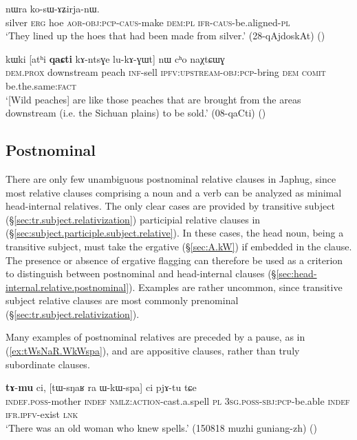 \begin{exe}
\ex \label{ex:qaR.thWkAsWBzu}
 nɯra ko-sɯ-ɤʑirja-nɯ. \\
silver \textsc{erg} hoe \textsc{aor}-\textsc{obj}:\textsc{pcp}-\textsc{caus}-make \textsc{dem}:\textsc{pl} \textsc{ifr}-\textsc{caus}-be.aligned-\textsc{pl} \\
\glt `They lined up the hoes that had been made from silver.' (28-qAjdoskAt)
()
\end{exe}  

\begin{exe}
\ex \label{ex:kAntsGe.lukAGWt}
\gll kɯki [atʰi \textbf{qaɕti} kɤ-ntsɣe lu-kɤ-ɣɯt] nɯ cʰo naχtɕɯɣ \\
\textsc{dem}.\textsc{prox} downstream peach \textsc{inf}-sell \textsc{ipfv}:\textsc{upstream}-\textsc{obj}:\textsc{pcp}-bring \textsc{dem} \textsc{comit} be.the.same:\textsc{fact} \\
\glt `[Wild peaches] are  like those peaches that are brought from the areas downstream (i.e. the Sichuan plains) to be sold.' (08-qaCti)
()
\end{exe}  
 
 \subsection{Postnominal} \label{sec:postnominal.relative}
 There are only few unambiguous postnominal relative clauses in Japhug, since most relative clauses comprising a noun and a verb can be analyzed as minimal head-internal relatives. The only clear cases are provided by transitive subject (§\ref{sec:tr.subject.relativization}) participial relative clauses in  (§\ref{sec:subject.participle.subject.relative}). In these cases, the head noun, being a transitive subject,  must take the ergative  (§\ref{sec:A.kW}) if embedded in the clause. The presence or absence of ergative flagging can therefore be used as a criterion to distinguish between postnominal and head-internal clauses (§\ref{sec:head-internal.relative.postnominal}). Examples are rather uncommon, since transitive subject relative clauses are most commonly prenominal (§\ref{sec:tr.subject.relativization}). 

Many examples of postnominal relatives are preceded by a pause, as in (\ref{ex:tWsNaR.WkWspa}), and are appositive clauses, rather than truly subordinate clauses. 

 \begin{exe}
\ex \label{ex:tWsNaR.WkWspa}
\gll \textbf{tɤ}-\textbf{mu} ci, [tɯ-sŋaʁ ra ɯ-kɯ-spa] ci pjɤ-tu tɕe \\
\textsc{indef}.\textsc{poss}-mother \textsc{indef} \textsc{nmlz}:\textsc{action}-cast.a.spell \textsc{pl} \textsc{3sg}.\textsc{poss}-\textsc{sbj}:\textsc{pcp}-be.able \textsc{indef} \textsc{ifr}.\textsc{ipfv}-exist \textsc{lnk} \\
\glt `There was an old woman who knew spells.' (150818 muzhi guniang-zh)
()
\end{exe}
 
